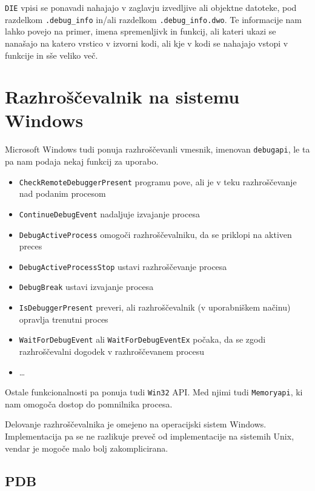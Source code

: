 \documentclass[a4paper,notitlepage]{article}
\newcommand{\code}[1]{\texttt{#1}}
\begin{document}
\code{DIE} vpisi se ponavadi nahajajo v zaglavju izvedljive ali objektne datoteke, pod razdelkom \code{.debug_info} in/ali razdelkom \code{.debug_info.dwo}.
Te informacije nam lahko povejo na primer, imena spremenljivk in funkcij, ali kateri ukazi se nanašajo na katero vrstico v izvorni kodi, ali kje v kodi se nahajajo vstopi v funkcije in sše veliko več.

\section{Razhroščevalnik na sistemu Windows}

Microsoft Windows tudi ponuja razhroščevanli vmesnik, imenovan \code{debugapi}\cite{win32-debugapi}, le ta pa nam podaja nekaj funkcij za uporabo.

\begin{itemize}
    \item \code{CheckRemoteDebuggerPresent} programu pove, ali je v teku razhroščevanje nad podanim procesom
    \item \code{ContinueDebugEvent} nadaljuje izvajanje procesa
    \item \code{DebugActiveProcess} omogoči razhroščevalniku, da se priklopi na aktiven preces
    \item \code{DebugActiveProcessStop} ustavi razhroščevanje procesa
    \item \code{DebugBreak} ustavi izvajanje procesa
    \item \code{IsDebuggerPresent} preveri, ali razhroščevalnik (v uporabniškem načinu) opravlja trenutni proces
    \item \code{WaitForDebugEvent} ali \code{WaitForDebugEventEx} počaka, da se zgodi razhroščevalni dogodek v razhroščevanem procesu
    \item \ldots
\end{itemize}

Ostale funkcionalnosti pa ponuja tudi \code{Win32} API\cite{win32-api}. Med njimi tudi \code{Memoryapi}\cite{win32-memapi}, ki nam omogoča dostop do pomnilnika procesa.

Delovanje razhroščevalnika je omejeno na operacijski sistem Windows. Implementacija pa se ne razlikuje preveč od implementacije na sistemih Unix, vendar je mogoče malo bolj zakomplicirana.

\subsection{PDB}
\end{document}
